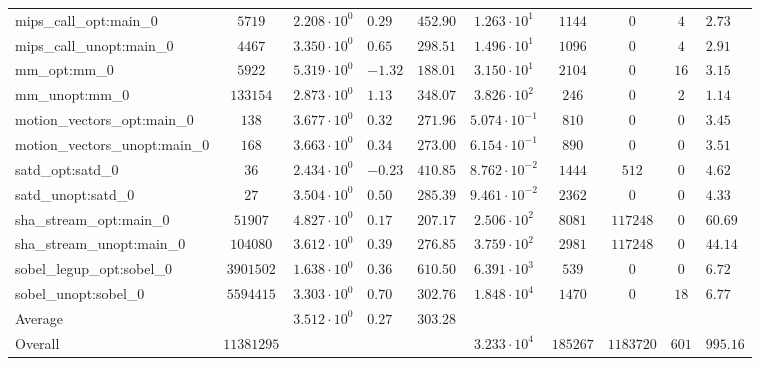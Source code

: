 \begin{tabular}{|l|c|HHc|c|c|c|cH|}
mips\_call\_opt:main\_0                         & $ 5719     $ & $ 2.208 \cdot 10^{0} $ & $ 0.29  $ & $ 452.90 $ & $ 1.263 \cdot 10^{1}  $ & $ 1144   $ & $ 0       $ & $ 4   $ & $ 2.73    $ \\
mips\_call\_unopt:main\_0                       & $ 4467     $ & $ 3.350 \cdot 10^{0} $ & $ 0.65  $ & $ 298.51 $ & $ 1.496 \cdot 10^{1}  $ & $ 1096   $ & $ 0       $ & $ 4   $ & $ 2.91    $ \\
mm\_opt:mm\_0                                   & $ 5922     $ & $ 5.319 \cdot 10^{0} $ & $ -1.32 $ & $ 188.01 $ & $ 3.150 \cdot 10^{1}  $ & $ 2104   $ & $ 0       $ & $ 16  $ & $ 3.15    $ \\
mm\_unopt:mm\_0                                 & $ 133154   $ & $ 2.873 \cdot 10^{0} $ & $ 1.13  $ & $ 348.07 $ & $ 3.826 \cdot 10^{2}  $ & $ 246    $ & $ 0       $ & $ 2   $ & $ 1.14    $ \\
motion\_vectors\_opt:main\_0                    & $ 138      $ & $ 3.677 \cdot 10^{0} $ & $ 0.32  $ & $ 271.96 $ & $ 5.074 \cdot 10^{-1} $ & $ 810    $ & $ 0       $ & $ 0   $ & $ 3.45    $ \\
motion\_vectors\_unopt:main\_0                  & $ 168      $ & $ 3.663 \cdot 10^{0} $ & $ 0.34  $ & $ 273.00 $ & $ 6.154 \cdot 10^{-1} $ & $ 890    $ & $ 0       $ & $ 0   $ & $ 3.51    $ \\
satd\_opt:satd\_0                               & $ 36       $ & $ 2.434 \cdot 10^{0} $ & $ -0.23 $ & $ 410.85 $ & $ 8.762 \cdot 10^{-2} $ & $ 1444   $ & $ 512     $ & $ 0   $ & $ 4.62    $ \\
satd\_unopt:satd\_0                             & $ 27       $ & $ 3.504 \cdot 10^{0} $ & $ 0.50  $ & $ 285.39 $ & $ 9.461 \cdot 10^{-2} $ & $ 2362   $ & $ 0       $ & $ 0   $ & $ 4.33    $ \\
sha\_stream\_opt:main\_0                        & $ 51907    $ & $ 4.827 \cdot 10^{0} $ & $ 0.17  $ & $ 207.17 $ & $ 2.506 \cdot 10^{2}  $ & $ 8081   $ & $ 117248  $ & $ 0   $ & $ 60.69   $ \\
sha\_stream\_unopt:main\_0                      & $ 104080   $ & $ 3.612 \cdot 10^{0} $ & $ 0.39  $ & $ 276.85 $ & $ 3.759 \cdot 10^{2}  $ & $ 2981   $ & $ 117248  $ & $ 0   $ & $ 44.14   $ \\
sobel\_legup\_opt:sobel\_0                      & $ 3901502  $ & $ 1.638 \cdot 10^{0} $ & $ 0.36  $ & $ 610.50 $ & $ 6.391 \cdot 10^{3}  $ & $ 539    $ & $ 0       $ & $ 0   $ & $ 6.72    $ \\
sobel\_unopt:sobel\_0                           & $ 5594415  $ & $ 3.303 \cdot 10^{0} $ & $ 0.70  $ & $ 302.76 $ & $ 1.848 \cdot 10^{4}  $ & $ 1470   $ & $ 0       $ & $ 18  $ & $ 6.77    $ \\
\hline
Average                                         & $          $ & $ 3.512 \cdot 10^{0} $ & $ 0.27  $ & $ 303.28 $ & $                     $ & $        $ & $         $ & $     $ & $         $ \\
\hline
Overall                                         & $ 11381295 $ & $                    $ & $       $ & $        $ & $ 3.233 \cdot 10^{4}  $ & $ 185267 $ & $ 1183720 $ & $ 601 $ & $ 995.16  $ \\
\hline
\end{tabular}
